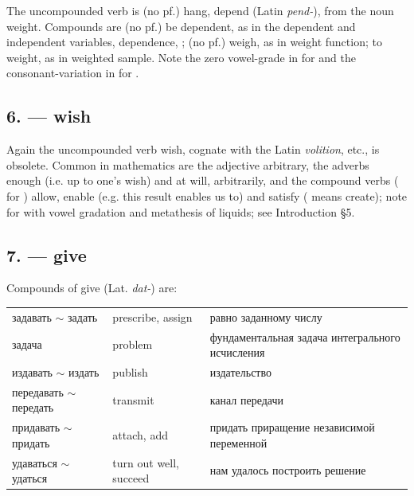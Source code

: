 The uncompounded verb is  (no pf.) hang, depend (Latin \emph{pend-}), from the noun  weight. Compounds are  (no pf.) be dependent, as in  the dependent and independent variables,  dependence, ;  (no pf.) weigh, as in  weight function;  to weight, as in  weighted sample. Note the zero vowel-grade in  for  and the consonant-variation in  for .

\subsection*{6.  --- wish}

Again the uncompounded verb  wish, cognate with the Latin \emph{volition}, etc., is obsolete. Common in mathematics are the adjective  arbitrary, the adverbs  enough (i.e. up to one's wish) and  at will, arbitrarily, and the compound verbs  ( for ) allow, enable (e.g.  this result enables us to) and  satisfy ( means create); note  for  with vowel gradation and metathesis of liquids; see Introduction §5.

\subsection*{7.  --- give}

Compounds of  give (Lat. \emph{dat-}) are:

\begin{center}
\small
\begin{tabular}{@{}>{\cyrillicfont}p{43mm}p{38mm}>{\cyrillicfont}p{57mm}@{}}
задавать $\sim$ задать & prescribe, assign & равно заданному числу\\
задача & problem & фундаментальная задача интегрального исчисления\\
издавать $\sim$ издать & publish & издательство\\
передавать $\sim$ передать & transmit & канал передачи\\
придавать $\sim$ придать & attach, add & придать приращение независимой переменной\\
удаваться $\sim$ удаться & turn out well, succeed & нам удалось построить решение\\
\end{tabular}
\end{center}


